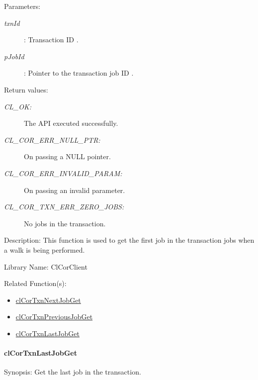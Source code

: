 \begin{Desc}
\item[Parameters:]
\begin{description}
\item[{\em txn\-Id}]: Transaction ID . \item[{\em p\-Job\-Id}]: Pointer to the transaction job ID .\end{description}
\end{Desc}
\begin{Desc}
\item[Return values:]
\begin{description}
\item[{\em CL\_\-OK:}]The API executed successfully. \item[{\em CL\_\-COR\_\-ERR\_\-NULL\_\-PTR:}]On passing a NULL pointer. \item[{\em CL\_\-COR\_\-ERR\_\-INVALID\_\-PARAM:}]On passing an invalid parameter. \item[{\em CL\_\-COR\_\-TXN\_\-ERR\_\-ZERO\_\-JOBS:}]No jobs in the transaction.\end{description}
\end{Desc}
\begin{Desc}
\item[Description:]This function is used to get the first job in the transaction jobs when a walk is being performed.\end{Desc}
\begin{Desc}
\item[Library Name:]Cl\-Cor\-Client\end{Desc}
\begin{Desc}
\item[Related Function(s):]\begin{itemize}
\item \hyperlink{group__group13}{cl\-Cor\-Txn\-Next\-Job\-Get} \item \hyperlink{group__group13}{cl\-Cor\-Txn\-Previous\-Job\-Get} \item \hyperlink{group__group13}{cl\-Cor\-Txn\-Last\-Job\-Get} \end{itemize}
\end{Desc}
\hypertarget{pagecor513}{}\paragraph{cl\-Cor\-Txn\-Last\-Job\-Get}\label{pagecor513}
\begin{Desc}
\item[Synopsis:]Get the last job in the transaction.\end{Desc}
